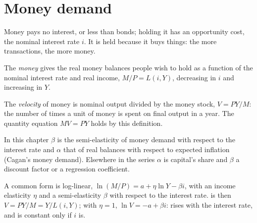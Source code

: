 \section{Money demand}\label{sec:b1:money-and-inflation:demand}

Money pays no interest, or less than bonds; holding it has an opportunity
cost, the nominal interest rate $i$. It is held because it buys things: the
more transactions, the more money.

\begin{definition}\label{def:b1:money-and-inflation:money-demand}
The \emph{money } gives the real money balances people wish
to hold as a function of the nominal interest rate and real income,
$M/P = L(i, Y)$, decreasing in $i$ and increasing in $Y$.
\end{definition}

\begin{definition}\label{def:b1:money-and-inflation:velocity}
The \emph{velocity} of money is nominal output divided by the money stock,
$V = PY/M$: the number of times a unit of money is spent on final output in
a year. The quantity equation $MV = PY$ holds by this definition.
\end{definition}

\begin{notation}\label{not:b1:money-and-inflation:symbols}
In this chapter $\beta$ is the semi-elasticity of money demand with respect to
the interest rate and $\alpha$ that of real balances with respect to expected
inflation (Cagan's money demand). Elsewhere in the series $\alpha$ is capital's
share and $\beta$ a discount factor or a regression coefficient.
\end{notation}

A common form is log-linear, $\ln(M/P) = a + \eta \ln Y - \beta i$, with an income
elasticity $\eta$ and a semi-elasticity $\beta$ with respect to the interest rate.
 is then $V = PY/M = Y/L(i, Y)$; with $\eta = 1$, $\ln V = -a + \beta i$:  rises
with the interest rate, and is constant only if $i$ is.

